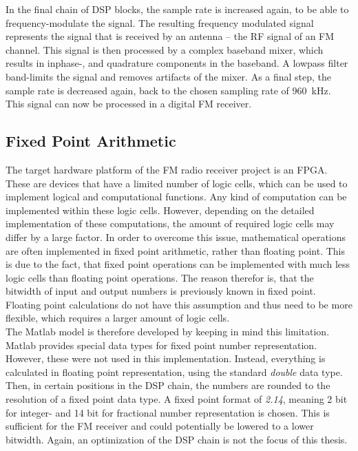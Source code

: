 In the final chain of DSP blocks, the sample rate is increased again, to be able to frequency-modulate the signal.
The resulting frequency modulated signal represents the signal that is received by an antenna -- the RF signal of an FM channel.
This signal is then processed by a complex baseband mixer, which results in inphase-, and quadrature components in the baseband.
A lowpass filter band-limits the signal and removes artifacts of the mixer.
As a final step, the sample rate is decreased again, back to the chosen sampling rate of 960~kHz.
This signal can now be processed in a digital FM receiver.


\subsection{Fixed Point Arithmetic}

The target hardware platform of the FM radio receiver project is an FPGA.
These are devices that have a limited number of logic cells, which can be used to implement logical and computational functions.
Any kind of computation can be implemented within these logic cells.
However, depending on the detailed implementation of these computations, the amount of required logic cells may differ by a large factor.
In order to overcome this issue, mathematical operations are often implemented in fixed point arithmetic, rather than floating point.
This is due to the fact, that fixed point operations can be implemented with much less logic cells than floating point operations.
The reason therefor is, that the bitwidth of input and output numbers is previously known in fixed point.
Floating point calculations do not have this assumption and thus need to be more flexible, which requires a larger amount of logic cells.\\

The Matlab model is therefore developed by keeping in mind this limitation.
Matlab provides special data types for fixed point number representation.
However, these were not used in this implementation.
Instead, everything is calculated in floating point representation, using the standard \textit{double} data type.
Then, in certain positions in the DSP chain, the numbers are rounded to the resolution of a fixed point data type.
A fixed point format of \textit{2.14}, meaning 2 bit for integer- and 14 bit for fractional number representation is chosen.
This is sufficient for the FM receiver and could potentially be lowered to a lower bitwidth.
Again, an optimization of the DSP chain is not the focus of this thesis.\\

